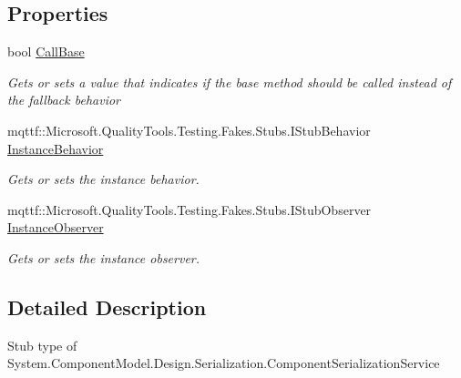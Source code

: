 \subsection*{Properties}
\begin{DoxyCompactItemize}
\item 
bool \hyperlink{class_system_1_1_component_model_1_1_design_1_1_serialization_1_1_fakes_1_1_stub_component_serialization_service_a268178289dd5848c8e284087b66db7a0}{Call\-Base}
\begin{DoxyCompactList}\small\item\em Gets or sets a value that indicates if the base method should be called instead of the fallback behavior\end{DoxyCompactList}\item 
mqttf\-::\-Microsoft.\-Quality\-Tools.\-Testing.\-Fakes.\-Stubs.\-I\-Stub\-Behavior \hyperlink{class_system_1_1_component_model_1_1_design_1_1_serialization_1_1_fakes_1_1_stub_component_serialization_service_a3d7ed33bcf64bea04776fd4308f7a612}{Instance\-Behavior}
\begin{DoxyCompactList}\small\item\em Gets or sets the instance behavior.\end{DoxyCompactList}\item 
mqttf\-::\-Microsoft.\-Quality\-Tools.\-Testing.\-Fakes.\-Stubs.\-I\-Stub\-Observer \hyperlink{class_system_1_1_component_model_1_1_design_1_1_serialization_1_1_fakes_1_1_stub_component_serialization_service_ac3604c50cf8ba19389054eec8a5bb549}{Instance\-Observer}
\begin{DoxyCompactList}\small\item\em Gets or sets the instance observer.\end{DoxyCompactList}\end{DoxyCompactItemize}


\subsection{Detailed Description}
Stub type of System.\-Component\-Model.\-Design.\-Serialization.\-Component\-Serialization\-Service




